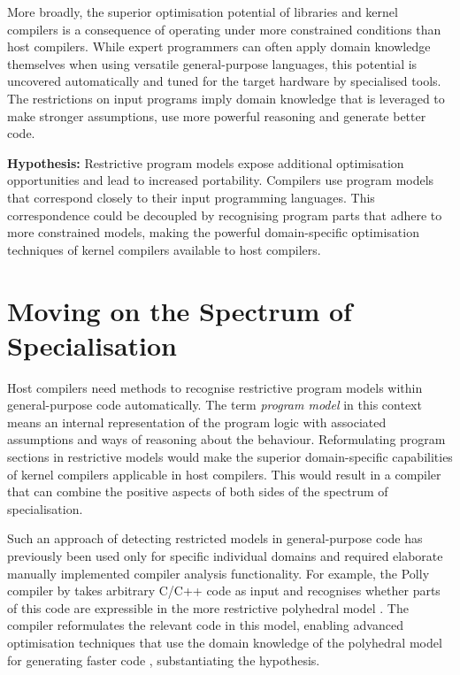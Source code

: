     More broadly, the superior optimisation potential of libraries and
    kernel compilers is a consequence of operating under more constrained
    conditions than host compilers.
    While expert programmers can often apply domain knowledge themselves
    when using versatile general-purpose languages, this potential is
    uncovered automatically and tuned for the target hardware by specialised
    tools.
    The restrictions on input programs imply domain knowledge that is leveraged
    to make stronger assumptions, use more powerful reasoning and generate
    better code.

    \vfill
    {\bf Hypothesis:}\quad
    Restrictive program models expose additional optimisation
    opportunities and lead to increased portability.
    Compilers use program models that correspond closely to their input
    programming languages.
    This correspondence could be decoupled by recognising program parts that
    adhere to more constrained models, making the powerful domain-specific
    optimisation techniques of kernel compilers available to host compilers.

\section{Moving on the Spectrum of Specialisation}

    Host compilers need methods to recognise restrictive program models within
    general-purpose code automatically. 
    The term {\it program model} in this context means an internal
    representation of the program logic with associated assumptions and ways of
    reasoning about the behaviour.
    Reformulating program sections in restrictive models would make the
    superior domain-specific capabilities of kernel compilers applicable in
    host compilers.
    This would result in a compiler that can combine the positive aspects of
    both sides of the spectrum of specialisation.

    Such an approach of detecting restricted models in general-purpose code has
    previously been used only for specific individual domains and required
    elaborate manually implemented compiler analysis functionality.
    For example, the Polly compiler by \citet{Lengauer2012Polly} takes
    arbitrary C/C++ code as input and recognises whether parts of this code
    are expressible in the more restrictive polyhedral model
    \citep{Karp:1967:OCU:321406.321418,benabderrahmane2010polyhedral}.
    The compiler reformulates the relevant code in this model, enabling
    advanced optimisation techniques that use the domain knowledge of the
    polyhedral model for generating faster code
    \citep{Moll:2016:ISS:2892208.2892217,Doerfert2015Polly}, substantiating the
    hypothesis.

